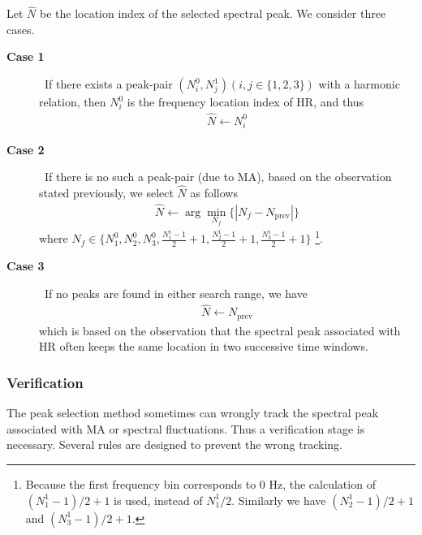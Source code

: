 \documentclass[10pt,twocolumn]{IEEEtran}
\begin{document}
Let $\widehat{N}$ be the location index of the selected spectral peak. We consider three cases.
\begin{description}
  \item[\textbf{Case 1} ] ~If there exists a peak-pair $(N_i^0, N_j^1) (i,j \in\{1,2,3\})$ with a harmonic relation, then $N_i^0$ is the  frequency location index of HR, and thus
\begin{eqnarray}
\widehat{N} \leftarrow  N_i^0
\end{eqnarray}

  \item[\textbf{Case 2} ] ~If there is no such a peak-pair (due to MA), based on the observation stated previously, we select $\widehat{N}$ as follows
\begin{eqnarray}
\widehat{N} \leftarrow \arg\min_{N_f} \{ | N_f - N_{\mathrm{prev}}| \}
\end{eqnarray}
where $N_f \in \{ N_1^0, N_2^0, N_3^0, \frac{N_1^1-1}{2}+1,  \frac{N_2^1-1}{2}+1, \frac{N_3^1-1}{2}+1   \}$ \footnote{Because the first frequency bin corresponds to 0 Hz, the calculation of $(N_1^1-1)/2+1$ is used, instead of $N_1^1/2$. Similarly we have $(N_2^1-1)/2+1$ and $(N_3^1-1)/2+1$.}.


  \item[\textbf{Case 3} ] ~If no peaks are found in either search range, we have
\begin{eqnarray}
\widehat{N} \leftarrow  N_{\mathrm{prev}}
\label{eq:case3}
\end{eqnarray}
  which is based on the observation that the spectral peak associated with HR often keeps the same location in two successive time windows.
\end{description}






\subsubsection{Verification}

The peak selection method sometimes can wrongly track the spectral peak associated with MA or spectral fluctuations. Thus a verification stage is necessary. Several rules are designed to prevent the wrong tracking.
\end{document}
